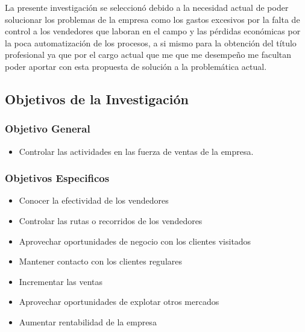 \large 
\doublespacing

La presente investigación se seleccionó debido a la necesidad actual de poder solucionar los problemas de la empresa como los gastos excesivos por la falta de control a los vendedores que laboran en el campo y las pérdidas económicas por la poca automatización de los procesos, a si mismo para la obtención del título profesional ya que por el cargo actual que me que me desempeño me facultan  poder aportar con esta propuesta de solución a la problemática actual.

\singlespacing


\subsection{Objetivos de la Investigación}

\subsubsection{Objetivo General}

\begin{itemize}[leftmargin=1cm]
\item Controlar las actividades en las fuerza de ventas de la empresa.
\end{itemize}

\subsubsection{Objetivos Especificos}


\begin{itemize}[leftmargin=1cm]
\item Conocer la efectividad de los vendedores
\item Controlar las rutas o recorridos de los vendedores
\item Aprovechar oportunidades de negocio con los clientes visitados
\item Mantener contacto con los clientes regulares
\item Incrementar las ventas
\item Aprovechar oportunidades de explotar otros mercados
\item Aumentar rentabilidad de la empresa

\end{itemize} 





